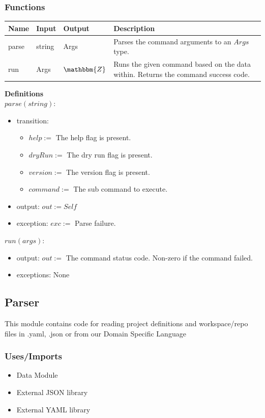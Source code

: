 \documentclass[11pt]{article}
\begin{document}
\subsubsection{Functions}

\begin{tabular}[h!]{l|l|l|p{6cm}}
  \textbf{Name} & \textbf{Input} & \textbf{Output} & \textbf{Description} \\
  \hline
  parse & string & Args & Parses the command arguments to an $Args$ type.\\
  \hline
  run & Args & $\mathbbm{Z}$ & Runs the given command based on the data within. Returns the command success code.
\end{tabular}

\vspace{2em}

\textbf{Definitions}\\

$parse(string):$
\begin{itemize}
\item transition:
  \begin{itemize}
  \item $help :=$ The help flag is present.
  \item $dryRun :=$ The dry run flag is present.
  \item $version :=$ The version flag is present.

  \item $command :=$ The sub command to execute.
  \end{itemize}
\item output: $out := Self$
\item exception: $exc :=$ Parse failure.
\end{itemize}

\vspace{1em}
$run(args):$
\begin{itemize}
\item output: $out :=$ The command status code. Non-zero if the command failed.
\item exceptions: None
\end{itemize}

\subsection{Parser}
\label{mod:parser}
This module contains code for reading project definitions and workspace/repo files
in .yaml, .json or from our Domain Specific Language
\subsubsection{Uses/Imports}
\begin{itemize}
  \item Data Module
  \item External JSON library
  \item External YAML library
\end{itemize}
\end{document}
